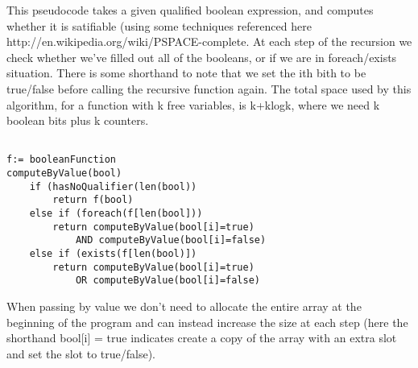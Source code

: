 \documentclass[11pt,fleqn]{article}
\begin{document}
\begin{enumerate}
This pseudocode takes a given qualified boolean expression, and computes whether it is satifiable (using some techniques referenced here http://en.wikipedia.org/wiki/PSPACE-complete. At each step of the recursion we check whether we've filled out all of the booleans, or if we are in foreach/exists situation. There is some shorthand to note that we set the ith bith to be true/false before calling the recursive function again. The total space used by this algorithm, for a function with k free variables, is k+klogk, where we need k boolean bits plus k counters. 

\begin{verbatim}

f:= booleanFunction
computeByValue(bool)
    if (hasNoQualifier(len(bool))
        return f(bool)
    else if (foreach(f[len(bool]))
        return computeByValue(bool[i]=true) 
            AND computeByValue(bool[i]=false)
    else if (exists(f[len(bool)])
        return computeByValue(bool[i]=true)
            OR computeByValue(bool[i]=false)

\end{verbatim}

When passing by value we don't need to allocate the entire array at the beginning of the program and can instead increase the size at each step (here the shorthand bool[i] = true indicates create a copy of the array with an extra slot and set the slot to true/false). 

\end{enumerate}
\end{document}
